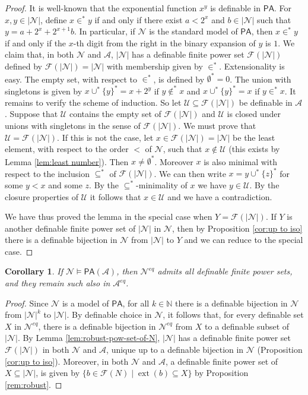 \documentclass{amsart}
\newcommand{\N}{\mathbb N}
\newcommand{\ca}{\mathcal}
\newcommand{\nin}{\not \in}
\theoremstyle{plain}
\newtheorem{cor}[thm]{Corollary}
\theoremstyle{definition}
\newcommand{\ins}{\in^*}
\newcommand{\F}{\mathcal{F}}
\newcommand{\ext}[1]{\operatorname{ext}(#1)}
\newcommand{\PA}{\mathsf{PA}}
\begin{document}
\begin{proof}
It is well-known that the exponential function $x^y$ is definable in $\PA$. 
    For $x,y\in |\ca N|$, define $x\ins y$ if and only if there exist $a<2^x$ and $b\in |\ca N|$ such that $y = a+2^x + 2^{x+1}b$. In particular, if $\ca N$ is the standard model of $\PA$, then $x \ins y$ if and only if the $x$-th digit from the right in the binary expansion of $y$ is $1$. We claim that, in both $\ca N$ and $\ca A$, $|\ca N|$ has a definable finite power set $\F(|\ca N|)$ defined by $\F(|\ca N|)= |\ca N|$ with membership given by $\ins$. Extensionality is easy. The empty set, with respect to $\ins$, is defined by $\emptyset^* = 0$. The union with singletons is given by $x \cup^* \{y\}^* = x+2^y$ if $y\nin^* x$ and $x \cup^* \{y\}^* = x$ if $y\ins x$. 
    It remains to verify the scheme of induction. So let $\ca U \subseteq \F(|\ca N|)$ be definable in $\ca A$. Suppose that $\ca U$ contains the empty set of $\F(|\ca N|)$ and $\ca U$ is closed under unions with singletons in the sense of $\F(|\ca N|)$. We must prove that $\ca U = \F(|\ca N|)$. If this is not the case, let $x\in \F(|\ca N|) = |\ca N|$ be the least element, with respect to the order $<$ of $\ca N$, such that $x\nin \ca U$ (this exists by Lemma \ref{lem:least number}). Then $x\neq \emptyset^*$. Moreover $x$ is also minimal with respect to the inclusion $\subseteq^*$ of $\F(|\ca N|)$. We can then write $x = y\cup^* \{z\}^*$ for some $y<x$ and some $z$. By the $\subseteq^*$-minimality of $x$ we have $y\in \ca U$. By the closure properties of $\ca U$ it follows that $x\in \ca U$ and we have a contradiction. 
    
    We have thus proved the lemma in the special case when $Y = \F(|\ca N|)$. If $Y$ is another definable finite power set of $|\ca N|$ in $\ca N$, then by Proposition \ref{cor:up to iso} there is a definable bijection in $\ca N$ from $|\ca N|$ to $Y$ and we can reduce to the special case. 
\end{proof}

\begin{cor}\label{cor:pow-set-robust-in-A}
    If $\ca N \models \PA(\ca A)$, then $\ca N^{eq}$ admits all definable finite power sets, and they remain such also in $\ca A^{eq}$.     
\end{cor}
\begin{proof}
Since $\ca N$ is a model of $\PA$, for all $k\in \N$ there is a definable bijection in $\ca N$ from $|\ca N|^k$ to $|\ca N|$. By definable choice in $\ca N$, it follows that, for every definable set $X$ in $\ca N^{eq}$, there is a definable bijection in $\ca N^{eq}$ from $X$ to a definable subset of $|\ca N|$. By Lemma \ref{lem:robust-pow-set-of-N}, $|\ca N|$ has a definable finite power set $\ca F(|\ca N|)$ in both $\ca N$ and $\ca A$, unique up to a definable bijection in $\ca N$ (Proposition \ref{cor:up to iso}). Moreover, in both $\ca N$ and $\ca A$, a definable finite power set of $X\subseteq |\ca N|$, is given by $\{b\in \ca F(N) \mid \ext b \subseteq X\}$ by Proposition \ref{rem:robust}.
\end{proof}
\end{document}
